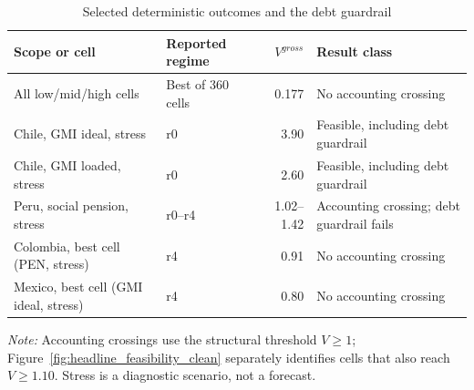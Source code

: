 \begin{table}[H]
\centering
\small
\begin{singlespace}
\caption{Selected deterministic outcomes and the debt guardrail}
\label{tab:deterministic_results_clean}
\begin{tabular}{@{}>{\raggedright\arraybackslash}p{}>{\raggedright\arraybackslash}p{}r >{\raggedright\arraybackslash}p{}@{}}
\toprule
Scope or cell & Reported regime & $V^{gross}$ & Result class \\
\midrule
All low/mid/high cells & Best of 360 cells & 0.177 & No accounting crossing \\
Chile, GMI ideal, stress & r0 & 3.90 & Feasible, including debt guardrail \\
Chile, GMI loaded, stress & r0 & 2.60 & Feasible, including debt guardrail \\
Peru, social pension, stress & r0--r4 & 1.02--1.42 & Accounting crossing; debt guardrail fails \\
Colombia, best cell (PEN, stress) & r4 & 0.91 & No accounting crossing \\
Mexico, best cell (GMI ideal, stress) & r4 & 0.80 & No accounting crossing \\
\bottomrule
\end{tabular}
\begin{minipage}{0.94\textwidth}\footnotesize
\emph{Note:} Accounting crossings use the structural threshold $V\geq1$; Figure~\ref{fig:headline_feasibility_clean} separately identifies cells that also reach $V\geq1.10$. Stress is a diagnostic scenario, not a forecast.
\end{minipage}
\end{singlespace}
\end{table}

